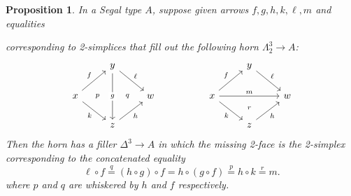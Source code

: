 \documentclass{amsart}
\theoremstyle{plain}
\newtheorem{prop}[thm]{Proposition}
\theoremstyle{definition}
\theoremstyle{remark}
\numberwithin{equation}{section}
\begin{document}
\begin{prop}\label{thm:32horn-concat}
  In a Segal type $A$, suppose given arrows $f,g,h,k,\ell,m$ and equalities
  corresponding to 2-simplices that fill out the following horn $\Lambda^3_2 \to A$:
  \[
  \begin{tikzcd}
    & y \ar[dd,"g" description] \ar[dr,"\ell"] &&&& y \ar[dr,"\ell"] \\
    x \ar[ur,"f"] \ar[dr,"k"'] \ar[rr,phantom,"\scriptstyle p" near start, "\scriptstyle q" near end] && w && x \ar[ur,"f"] \ar[dr,"k"'] \ar[rr,"m"] && w \\
    & z \ar[ur,"h"'] &&&& z \ar[ur,"h"'] \ar[uu,phantom,"\scriptstyle r" near start]
  \end{tikzcd}
  \]
  Then the horn has a filler $\Delta^3 \to A$ in which the missing 2-face is the 2-simplex corresponding to the concatenated equality
  \begin{equation}\label{eq:32horn-concat}
    \ell \circ f \overset q= (h\circ g) \circ f
    = h \circ (g\circ f)
    \overset p= h\circ k
    \overset r= m.
  \end{equation}
  where $p$ and $q$ are whiskered by $h$ and $f$ respectively.
\end{prop}
\end{document}
